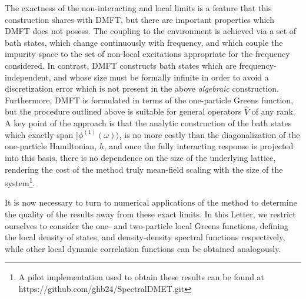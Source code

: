 \documentclass[aps,twocolumn,nobibnotes]{revtex4}
\begin{document}
The exactness of the non-interacting and local limits is a feature that this construction shares with DMFT, but there are important properties which 
DMFT does not posess. The coupling to the environment
is achieved via a set of bath states, which change continuously with frequency, and which couple the impurity space to the set of non-local excitations appropriate for the frequency considered. 
In contrast, DMFT constructs bath states which are
frequency-independent, and whose size must be formally infinite in order to avoid a discretization error which is not present in the above {\em algebraic} 
construction. Furthermore, DMFT is formulated in terms of the one-particle Greens function, but the procedure outlined above is suitable for 
general operators ${\hat V}$ of any rank. 
A key point of the approach is that the analytic construction
of the bath states which exactly span $|\phi^{(1)}(\omega) \rangle$, is no more costly than the diagonalization of the one-particle Hamiltonian, $h$, 
and once the fully interacting response is projected into this basis, there is no dependence on the size of the underlying lattice, rendering 
the cost of the method truly mean-field scaling with the size of the system\footnote{A pilot implementation used to obtain these results can be found at https://github.com/ghb24/SpectralDMET.git}. 

It is now necessary to turn to numerical applications of the method to determine the quality of the results away from these exact limits. 
In this Letter, we restrict ourselves to consider the one- and two-particle local Greens functions,
defining the local density of states, and density-density spectral functions respectively, while other local dynamic correlation functions can be obtained analogously.
\end{document}
